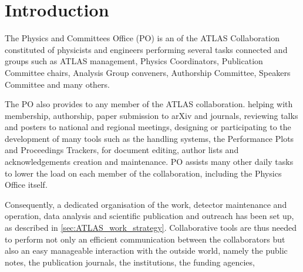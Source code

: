 
\section{Introduction}%
\label{sec:Introduction}

The Physics and Committees Office (PO) is an  of the ATLAS Collaboration constituted of physicists and engineers performing several tasks connected  and groups such as ATLAS management, Physics Coordinators, Publication Committee chairs, Analysis Group conveners, Authorship Committee, Speakers
Committee and many others.

The PO also provides  to any member of the ATLAS collaboration.  helping with membership, authorship, paper submission to arXiv and journals, reviewing talks and posters to national and regional meetings, designing or participating to the development of many tools such as the  handling systems, the Performance Plots and Proceedings Trackers,  for document editing, author lists and acknowledgements creation and maintenance.
PO assists many other daily tasks to lower the load on each member of the collaboration, including the Physics Office itself.

Consequently, a dedicated organisation of the work, detector maintenance and operation, data analysis and scientific publication and outreach has been set up, as described in \cref{sec:ATLAS_work_strategy}.
Collaborative tools are thus needed to perform not only an efficient communication between the collaborators but also an easy manageable interaction with the outside world, namely the public notes, the publication journals, the institutions, the funding agencies, 

